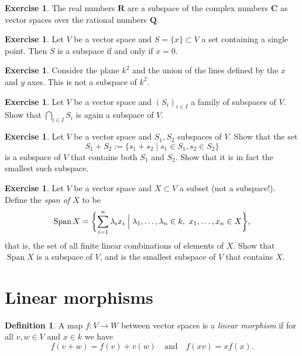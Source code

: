 \documentclass[11pt]{article}
\theoremstyle{definition}
\newtheorem{defi}[theo]{Definition}
\newtheorem{exer}[theo]{Exercise}
\def\CC{\mathbf{C}}
\def\RR{\mathbf{R}}
\def\QQ{\mathbf{Q}}
\begin{document}
\begin{exer}
The real numbers $\RR$ are a subspace of the complex numbers $\CC$ as vector spaces over the rational numbers $\QQ$.
\end{exer}

\begin{exer}
Let $V$ be a vector space and $S = \{x\} \subset V$ a set containing a single point.
Then $S$ is a subspace if and only if $x = 0$.
\end{exer}

\begin{exer}
Consider the plane $k^2$ and the union of the lines defined by the $x$ and $y$ axes.
This is not a subspace of $k^2$.
\end{exer}


\begin{exer}
Let $V$ be a vector space and $(S_i)_{i \in I}$ a family of subspaces of $V$.
Show that $\bigcap_{i \in I} S_i$ is again a subspace of $V$.
\end{exer}


\begin{exer}
Let $V$ be a vector space and $S_1, S_2$ subspaces of $V$.
Show that the set
\[
S_1 + S_2 := \{ s_1 + s_2 \mid s_1 \in S_1, s_2 \in S_2 \}
\]
is a subspace of $V$ that contains both $S_1$ and $S_2$.
Show that it is in fact the smallest such subspace.
\end{exer}


\begin{exer}
Let $V$ be a vector space and $X \subset V$ a subset (not a subspace!).
Define the \emph{span of $X$} to be
\[
\operatorname{Span} X 
= \biggl\{ \sum_{i=1}^n \lambda_i x_i \Bigm|
\lambda_1,\ldots,\lambda_n \in k, \ x_1, \ldots, x_n \in X \biggr\},
\]
that is, the set of all finite linear combinations of elements of $X$.
Show that $\operatorname{Span} X$ is a subspace of $V$, and is the smallest subspace of $V$ that contains $X$.
\end{exer}


\section{Linear morphisms}


\begin{defi}
A map $f : V \to W$ between vector spaces is a \emph{linear morphism} if for all $v,w \in V$ and $x \in k$ we have
\[
f(v + w) = f(v) + v(w)
\quad\text{and}\quad
f(xv) = xf(x).
\]
\end{defi}
\end{document}
